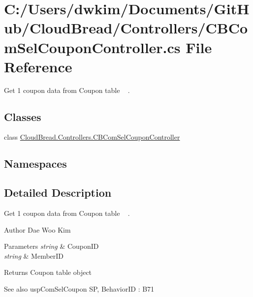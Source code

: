 \hypertarget{a00124}{}\section{C\+:/\+Users/dwkim/\+Documents/\+Git\+Hub/\+Cloud\+Bread/\+Controllers/\+C\+B\+Com\+Sel\+Coupon\+Controller.cs File Reference}
\label{a00124}


Get 1 coupon data from Coupon table ~\newline
.  


\subsection*{Classes}
\begin{DoxyCompactItemize}
\item 
class \hyperlink{a00013}{Cloud\+Bread.\+Controllers.\+C\+B\+Com\+Sel\+Coupon\+Controller}
\end{DoxyCompactItemize}
\subsection*{Namespaces}
\begin{DoxyCompactItemize}
\end{DoxyCompactItemize}


\subsection{Detailed Description}
Get 1 coupon data from Coupon table ~\newline
. 

\begin{DoxyAuthor}{Author}
Dae Woo Kim 
\end{DoxyAuthor}

\begin{DoxyParams}{Parameters}
{\em string} & Coupon\+ID \\
\hline
{\em string} & Member\+ID \\
\hline
\end{DoxyParams}
\begin{DoxyReturn}{Returns}
Coupon table object 
\end{DoxyReturn}
\begin{DoxySeeAlso}{See also}
usp\+Com\+Sel\+Coupon SP, Behavior\+ID \+: B71 
\end{DoxySeeAlso}
